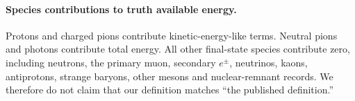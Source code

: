 \paragraph{Species contributions to truth available energy.} Protons and charged pions contribute kinetic-energy-like terms. Neutral pions and photons contribute total energy. All other final-state species contribute zero, including neutrons, the primary muon, secondary $e^\pm$, neutrinos, kaons, antiprotons, strange baryons, other mesons and nuclear-remnant records. We therefore do not claim that our definition matches ``the published definition.''

